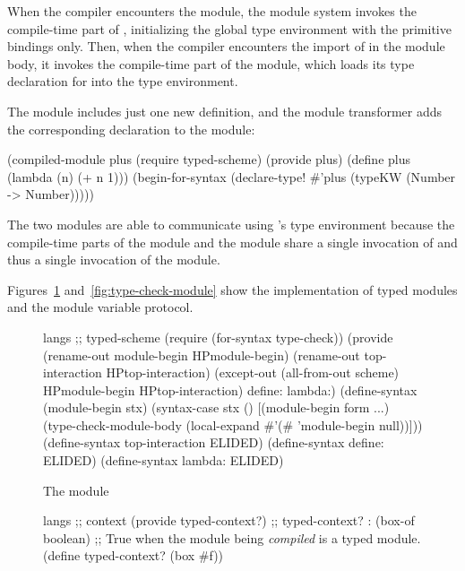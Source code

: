\begin{schemeregion}
When the compiler encounters the  module, the module
system invokes the compile-time part of ,
initializing the global type environment with the primitive bindings
only. Then, when the compiler encounters the import of  in
the module body, it invokes the compile-time part of the 
module, which loads its type declaration for  into
the type environment.

The  module includes just one new definition, and the
module transformer adds the corresponding declaration to the module:
\begin{schemedisplay}
(compiled-module plus
  (require typed-scheme)
  (provide plus)
  (define plus (lambda (n) (+ n 1)))
  (begin-for-syntax
    (declare-type! #'plus (typeKW (Number -> Number)))))
\end{schemedisplay}

The two modules are able to communicate using 's
type environment because the compile-time parts of the 
module and the  module share a single invocation of
 and thus a single invocation of the 
module.

Figures~\ref{fig:typed-scheme-module} and~\ref{fig:type-check-module}
show the implementation of typed modules and the module variable
protocol.

\begin{figure}[p!]
\begin{schemedisplay}
langs ;; typed-scheme
(require (for-syntax type-check))
(provide (rename-out module-begin HPmodule-begin)
	 (rename-out top-interaction HPtop-interaction)
	 (except-out (all-from-out scheme)
		     HPmodule-begin HPtop-interaction)
	 define:
	 lambda:)
(define-syntax (module-begin stx)
  (syntax-case stx ()
    [(module-begin form ...)
     (type-check-module-body
      (local-expand #'(#%
		    'module-begin
		    null))]))
(define-syntax top-interaction ELIDED)
(define-syntax define: ELIDED)
(define-syntax lambda: ELIDED)
\end{schemedisplay}
\caption{The  module}
\label{fig:typed-scheme-module}
\end{figure}

\begin{figure}[p!]
\begin{schemedisplay}
langs ;; context
(provide typed-context?)
;; typed-context? : (box-of boolean)
;; True when the module being \emph{compiled} is a typed module.
(define typed-context? (box #f))


\end{schemedisplay}
\end{figure}
\end{schemeregion}
